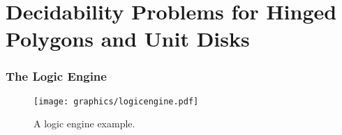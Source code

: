 


\chapter{Decidability Problems for Hinged Polygons and Unit Disks}
\subsection{The Logic Engine}
\begin{figure}[!htbp]
\begin{center}
\texttt{[image: graphics/logicengine.pdf]}
\caption{A logic engine example.}\label{fig:logicengine-1}
\end{center}
\end{figure}
